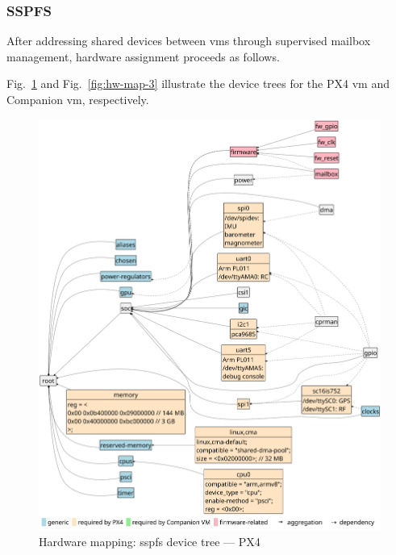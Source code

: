 \subsubsection{SSPFS}
\label{sec:final-scenario}
After addressing shared devices between \glspl{vm} through supervised mailbox management, hardware assignment proceeds as follows.

Fig.~\ref{fig:hw-map-2} and Fig.~\ref{fig:hw-map-3} illustrate the device trees
for the PX4 \gls{vm} and Companion \gls{vm}, respectively.

\begin{figure}[!hbt]
  \centering
  \includegraphics[width=1.0\textwidth]{./img/pdf/hw-map-2} 
  \caption[Hardware mapping: SSPFS device tree --- PX4]{Hardware mapping:
  \gls{sspfs} device tree --- PX4}%
  \label{fig:hw-map-2}
\end{figure}

